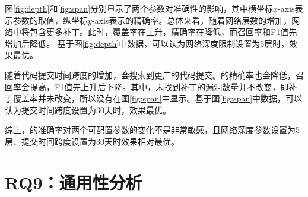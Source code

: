 图\ref{fig:depth}和\ref{fig:span}分别显示了两个参数对\tool 准确性的影响，其中横坐标$x$-axis表示参数的取值，纵坐标$y$-axis表示\tool 的精确率。总体来看，随着网络层数的增加，网络中将包含更多补丁。此时，\tool 覆盖率在上升，精确率在降低，而召回率和F1值先增加后降低。
基于图\ref{fig:depth}中数据，可以认为网络深度限制设置为5层时，\tool 效果最优。

随着代码提交时间跨度的增加，\tool 会搜索到更广的代码提交。\tool 的精确率也会降低，召回率会提高，F1值先上升后下降。其中，\tool 未找到补丁的漏洞数量并不改变，即补丁覆盖率并未改变，所以没有在图\ref{fig:span}中显示。基于图\ref{fig:span}中数据，可以认为提交时间跨度设置为30天时，\tool 效果最优。

综上，\tool 的准确率对两个可配置参数的变化不是非常敏感，且网络深度参数设置为5层、提交时间跨度设置为30天时效果相对最优。

\section{RQ9：通用性分析}\label{sec:generality}


